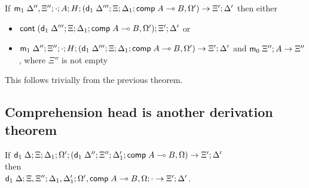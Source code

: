 \documentclass[9pt]{article}
\begin{document}
If $\mathsf{m}_1 \; \Delta'', \Xi''; \cdot; A ; H; (\mathsf{d}_1 \; \Delta'''; \Xi; \Delta_1; \mathsf{comp} \; A \multimap B, \Omega') \rightarrow \Xi'; \Delta'$ then either

\begin{itemize}
\item $\mathsf{cont} \; (\mathsf{d}_1 \; \Delta'''; \Xi; \Delta_1; \mathsf{comp} \; A \multimap B, \Omega'); \Xi'; \Delta'$ or
\item $\mathsf{m}_1 \; \Delta'' ; \Xi''; \cdot; H; (\mathsf{d}_1 \; \Delta'''; \Xi; \Delta_1; \mathsf{comp} \; A \multimap B, \Omega') \rightarrow \Xi'; \Delta'$ and $\mathsf{m}_0 \; \Xi''; A \rightarrow \Xi''$, where $\Xi''$ is not empty
\end{itemize}

This follows trivially from the previous theorem.

\subsection{Comprehension head is another derivation theorem}

If $\mathsf{d}_1 \; \Delta; \Xi; \Delta_1; \Omega'; (\mathsf{d}_1 \; \Delta''; \Xi''; \Delta'_1; \mathsf{comp} \; A \multimap B, \Omega) \rightarrow \Xi'; \Delta'$ \\ then \\ $\mathsf{d}_1 \; \Delta; \Xi, \Xi''; \Delta_1, \Delta'_1; \Omega', \mathsf{comp} \; A \multimap B, \Omega; \cdot \rightarrow \Xi'; \Delta'$.
\end{document}
